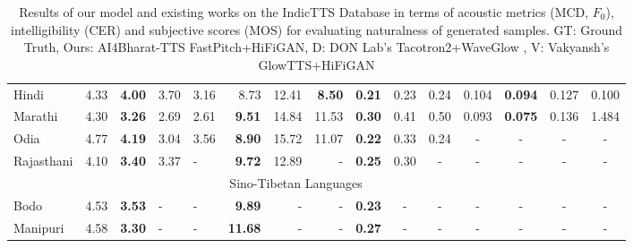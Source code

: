\documentclass{article}
\begin{document}
\begin{table*}[ht]
\begin{tabular}{@{}lllllrrrccccccc@{}}
Hindi      & 4.33 & \textbf{4.00} & 3.70 & 3.16 & 8.73           & 12.41 & \textbf{8.50} & \textbf{0.21} & 0.23 & 0.24        & 0.104  & \textbf{0.094} & 0.127 & 0.100          \\
Marathi    & 4.30 & \textbf{3.26} & 2.69 & 2.61 & \textbf{9.51}  & 14.84 & 11.53         & \textbf{0.30} & 0.41 & 0.50         & 0.093 & \textbf{0.075} & 0.136 & 1.484          \\
Odia       & 4.77 & \textbf{4.19} & 3.04 & 3.56 & \textbf{8.90}  & 15.72 & 11.07         & \textbf{0.22} & 0.33 & 0.24         & - & -              & -     & -              \\
Rajasthani & 4.10 & \textbf{3.40} & 3.37 & -    & \textbf{9.72}  & 12.89 & -             & \textbf{0.25} & 0.30 & -             & - & -              & -     & -               \\
\midrule
\multicolumn{14}{c}{Sino-Tibetan Languages}                                                                           \\ 
\midrule
Bodo       & 4.53 & \textbf{3.53} & -    & -    & \textbf{9.89}  & -     & -             & \textbf{0.23} & -    & -            & - & -              & -     & -              \\
Manipuri   & 4.58 & \textbf{3.30} & -    & -    & \textbf{11.68} & -     & -             & \textbf{0.27} & -    & -            & - & -              & -     & -              \\
\bottomrule
\end{tabular}
\endgroup
\caption{Results of our model and existing works on the IndicTTS Database in terms of acoustic metrics (MCD, $F_0$), intelligibility (CER) and subjective scores (MOS) for evaluating naturalness of generated samples. GT: Ground Truth, Ours: AI4Bharat-TTS FastPitch+HiFiGAN, D: DON Lab's Tacotron2+WaveGlow \cite{prakash2020generic}, V: Vakyansh's GlowTTS+HiFiGAN\cite{vakyansh2021glow}}
\label{tab:main}
\end{table*}
\end{document}

